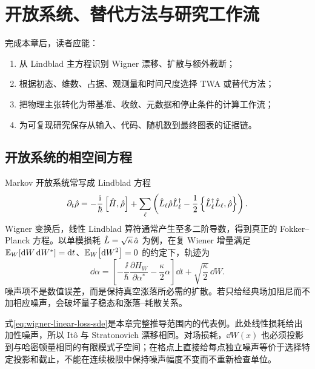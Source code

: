 \chapter{开放系统、替代方法与研究工作流}
\label{ch:extensions-workflow}

\begin{learningobjectives}
完成本章后，读者应能：
\begin{enumerate}
  \item 从 Lindblad 主方程识别 Wigner 漂移、扩散与额外截断；
  \item 根据初态、维数、占据、观测量和时间尺度选择 TWA 或替代方法；
  \item 把物理主张转化为带基准、收敛、元数据和停止条件的计算工作流；
  \item 为可复现研究保存从输入、代码、随机数到最终图表的证据链。
\end{enumerate}
\end{learningobjectives}

\section{开放系统的相空间方程}

Markov 开放系统常写成 Lindblad 方程\cite{Lindblad1976}
\begin{equation}
  \partial_t\hat\rho=-\frac{\mathrm{i}}{\hbar}\left[\hat H,\hat\rho\right]
  +\sum_\ell\left(
  \hat L_\ell\hat\rho\hat L_\ell^\dagger
  -\frac12\left\{\hat L_\ell^\dagger\hat L_\ell,\hat\rho\right\}
  \right).
  \label{eq:lindblad-master-equation}
\end{equation}
Wigner 变换后，线性 Lindblad 算符通常产生至多二阶导数，得到真正的 Fokker--Planck 方程。以单模损耗
$\hat L=\sqrt\kappa\,\hat a$ 为例，在复 Wiener 增量满足
$\mathbb{E}_{W}\!\left[\mathop{}\!\mathrm{d} W\mathop{}\!\mathrm{d} W^*\right]=\mathop{}\!\mathrm{d} t$、$\mathbb{E}_{W}\!\left[\mathop{}\!\mathrm{d} W^2\right]=0$ 的约定下，轨迹为
\begin{equation}
  \dd\alpha=\left[-\frac{\ii}{\hbar}
  \frac{\partial H_W}{\partial\alpha^*}
  -\frac\kappa2\alpha\right]\dd t
  +\sqrt{\frac\kappa2}\,\dd W.
  \label{eq:wigner-linear-loss-sde}
\end{equation}
噪声项不是数值误差，而是保持真空涨落所必需的扩散。若只给经典场加阻尼而不加相应噪声，会破坏量子稳态和涨落--耗散关系。

式\eqref{eq:wigner-linear-loss-sde}是本章完整推导范围内的代表例。此处线性损耗给出加性噪声，所以 It\^o 与 Stratonovich 漂移相同。对场损耗，$\dd W(x)$ 也必须投影到与哈密顿量相同的有限模式子空间；在格点上直接给每点独立噪声等价于选择特定投影和截止，不能在连续极限中保持噪声幅度不变而不重新检查单位。

